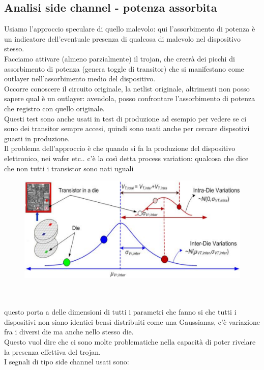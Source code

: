 \documentclass[oneside, 12pt]{extbook}
\begin{document}
\subsection{Analisi side channel - potenza assorbita}
Usiamo l'approccio speculare di quello malevolo: qui l'assorbimento di potenza è un indicatore dell'eventuale presenza di qualcosa di malevolo nel dispositivo stesso.
\\Facciamo attivare (almeno parzialmente) il trojan, che creerà dei picchi di assorbimento di potenza (genera toggle di transitor) che si manifestano come outlayer nell'assorbimento medio del dispositivo.
\\Occorre conoscere il circuito originale, la netlist originale, altrimenti non posso sapere qual è un outlayer: avendola, posso confrontare l'assorbimento di potenza che registro con quello originale.
\\Questi test sono anche usati in test di produzione ad esempio per vedere se ci sono dei transitor sempre accesi, quindi sono usati anche per cercare dispsotivi guasti in produzione.
\\Il problema dell'approccio è che quando si fa la produzione del dispositivo elettronico, nei wafer etc.. c'è la così detta process variation: qualcosa che dice che non tutti i transistor sono nati uguali\\
\begin{figure}[!h]
	\includegraphics[scale=0.4]{immagini/hardware/die_distrib.png}
\end{figure}
\\\\questo porta a delle dimensioni di tutti i parametri che fanno si che tutti i dispositivi non siano identici bensì distribuiti come una Gaussianas, c'è variazione fra i diversi die ma anche nello stesso die.
\\Questo vuol dire che ci sono molte problematiche nella capacità di poter rivelare la presenza effettiva del trojan.
\\I segnali di tipo side channel usati sono:
\end{document}
